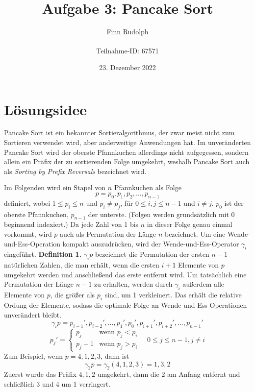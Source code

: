 \documentclass[a4paper, 11pt, ngerman]{article}
\title{\Huge Aufgabe 3: Pancake Sort}
\author{\Large Finn Rudolph \\ \\ \Large Teilnahme-ID: 67571}
\date{\Large 23. Dezember 2022}
\begin{document}
\begin{titlepage}
    \maketitle
    \thispagestyle{empty}
\end{titlepage}

\tableofcontents
\thispagestyle{empty}
\newpage

\section{Lösungsidee}

Pancake Sort ist ein bekannter Sortieralgorithmus, der zwar meist nicht zum Sortieren verwendet wird, aber anderweitige Anwendungen hat. Im unveränderten Pancake Sort wird der oberste Pfannkuchen allerdings nicht aufgegessen, sondern allein ein Präfix der zu sortierenden Folge umgekehrt, weshalb Pancake Sort auch als \emph{Sorting by Prefix Reversals} bezeichnet wird.

Im Folgenden wird ein Stapel von $n$ Pfannkuchen als Folge
$$
    p = p_0, p_1, p_2, \dots, p_{n - 1}
$$
definiert, wobei $1 \le p_i \le n$ und $p_i \ne p_j$, für $0 \le i, j \le n-1$ und $i \ne j$. $p_0$ ist der oberste Pfannkuchen, $p_{n - 1}$ der unterste. (Folgen werden grundsätzlich mit 0 beginnend indexiert.) Da jede Zahl von 1 bis $n$ in dieser Folge genau einmal vorkommt, wird $p$ auch als Permutation der Länge $n$ bezeichnet. Um eine Wende-und-Ess-Operation kompakt auszudrücken, wird der Wende-und-Ess-Operator $\gamma_i$ eingeführt.
\newline \newline
\textbf{Definition 1.} $\gamma_i p$ bezeichnet die Permutation der ersten $n - 1$ natürlichen Zahlen, die man erhält, wenn die ersten $i+1$ Elemente von $p$ umgekehrt werden und anschließend das erste entfernt wird. Um tatsächlich eine Permutation der Länge $n - 1$ zu erhalten, werden durch $\gamma_i$ außerdem alle Elemente von $p$, die größer als $p_i$ sind, um 1 verkleinert. Das erhält die relative Ordung der Elemente, sodass die optimale Folge an Wende-und-Ess-Operationen unverändert bleibt.
$$
    \gamma_i p = p_{i-1}', p_{i-2}', \dots, p_1', p_0', p_{i+1}', p_{i+2}', \dots, p_{n-1}'
$$
$$
    p_j' = \begin{cases}
        p_j     & \text{wenn } p_j < p_i \\
        p_j - 1 & \text{wenn } p_j > p_i
    \end{cases}
    \quad 0 \le j \le n - 1, j \ne i
$$
\newline \newline
Zum Beispiel, wenn $p = 4, 1, 2, 3$, dann ist
$$
    \gamma_2 p = \gamma_2 (4, 1, 2, 3) = 1, 3, 2
$$
Zuerst wurde das Präfix $4, 1, 2$ umgekehrt, dann die 2 am Anfang entfernt und schließlich 3 und 4 um 1 verringert.
\end{document}
